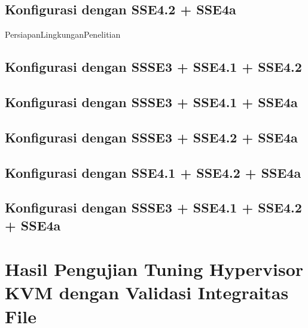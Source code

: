 \subsection{Konfigurasi dengan SSE4.2 + SSE4a}
PersiapanLingkunganPenelitian

\subsection{Konfigurasi dengan SSSE3 + SSE4.1 + SSE4.2}

\subsection{Konfigurasi dengan SSSE3 + SSE4.1 + SSE4a}

\subsection{Konfigurasi dengan SSSE3 + SSE4.2 + SSE4a}

\subsection{Konfigurasi dengan SSE4.1 + SSE4.2 + SSE4a}

\subsection{Konfigurasi dengan SSSE3 + SSE4.1 + SSE4.2 + SSE4a}

\section{Hasil Pengujian Tuning Hypervisor KVM dengan Validasi Integraitas File}

